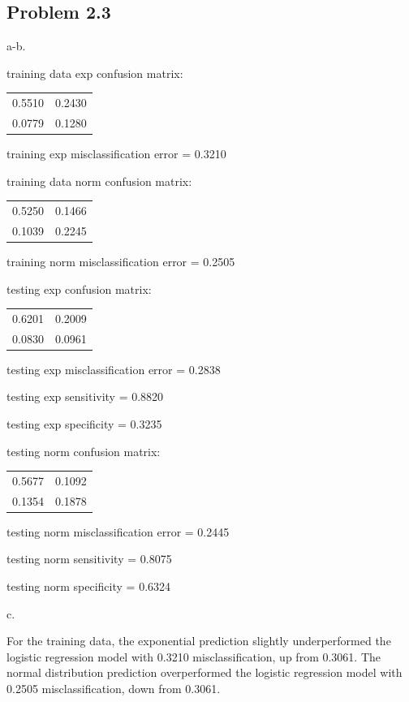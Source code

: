 \documentclass[a4paper]{article}
\begin{document}
\subsection{Problem 2.3}

a-b. 

\noindent
training data exp confusion matrix: 
\begin{table}[htb]
\begin{tabular}{ll}
0.5510 & 0.2430 \\
0.0779 & 0.1280
\end{tabular}
\end{table}

\noindent
training exp misclassification error = 0.3210

\noindent
training data norm confusion matrix: 
\begin{table}[htb]
\begin{tabular}{ll}
 0.5250 & 0.1466 \\
0.1039      & 0.2245
\end{tabular}
\end{table}

\noindent
training norm misclassification error = 0.2505

\noindent
testing exp confusion matrix:
\begin{table}[htb]
\begin{tabular}{ll}
0.6201 & 0.2009 \\
0.0830 & 0.0961 
\end{tabular}
\end{table}

\noindent
testing exp misclassification error = 0.2838

\noindent
testing exp sensitivity = 0.8820

\noindent 
testing exp specificity = 0.3235



\noindent
testing norm confusion matrix:


\begin{tabular}{ll}
0.5677 & 0.1092 \\
0.1354 & 0.1878
\end{tabular}


\noindent
testing norm misclassification error = 0.2445

\noindent
testing norm sensitivity = 0.8075

\noindent 
testing norm specificity = 0.6324


\noindent
c. 

\noindent
For the training data, the exponential prediction slightly underperformed the logistic regression model with 0.3210 misclassification, up from 0.3061. The normal distribution prediction overperformed the logistic regression model with 0.2505 misclassification, down from 0.3061.
\end{document}
